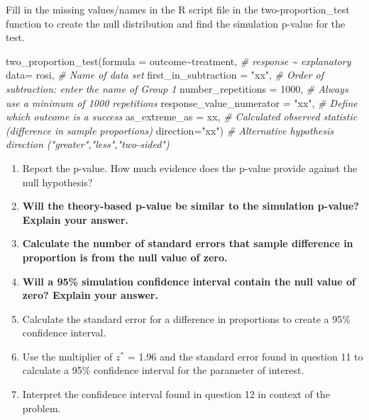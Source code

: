 \documentclass[
]{report}
\newenvironment{Shaded}{\begin{snugshade}}{\end{snugshade}}
\newcommand{\AttributeTok}[1]{\textcolor[rgb]{0.77,0.63,0.00}{#1}}
\newcommand{\CommentTok}[1]{\textcolor[rgb]{0.56,0.35,0.01}{\textit{#1}}}
\newcommand{\DecValTok}[1]{\textcolor[rgb]{0.00,0.00,0.81}{#1}}
\newcommand{\FunctionTok}[1]{\textcolor[rgb]{0.00,0.00,0.00}{#1}}
\newcommand{\NormalTok}[1]{#1}
\newcommand{\SpecialCharTok}[1]{\textcolor[rgb]{0.00,0.00,0.00}{#1}}
\newcommand{\StringTok}[1]{\textcolor[rgb]{0.31,0.60,0.02}{#1}}
\begin{document}
Fill in the missing values/names in the R script file in the two-proportion\_test function to create the null distribution and find the simulation p-value for the test.

\begin{Shaded}
\begin{Highlighting}[]
\FunctionTok{two\_proportion\_test}\NormalTok{(}\AttributeTok{formula =}\NormalTok{ outcome}\SpecialCharTok{\textasciitilde{}}\NormalTok{treatment, }\CommentTok{\# response \textasciitilde{} explanatory}
         \AttributeTok{data=}\NormalTok{ rosi, }\CommentTok{\# Name of data set}
         \AttributeTok{first\_in\_subtraction =} \StringTok{"xx"}\NormalTok{, }\CommentTok{\# Order of subtraction: enter the name of Group 1}
         \AttributeTok{number\_repetitions =} \DecValTok{1000}\NormalTok{, }\CommentTok{\# Always use a minimum of 1000 repetitions}
         \AttributeTok{response\_value\_numerator =} \StringTok{"xx"}\NormalTok{, }\CommentTok{\# Define which outcome is a success }
         \AttributeTok{as\_extreme\_as =}\NormalTok{ xx, }\CommentTok{\# Calculated observed statistic (difference in sample proportions)}
         \AttributeTok{direction=}\StringTok{"xx"}\NormalTok{) }\CommentTok{\# Alternative hypothesis direction ("greater","less","two{-}sided")}
\end{Highlighting}
\end{Shaded}

\begin{enumerate}
\def\labelenumi{\arabic{enumi}.}
\setcounter{enumi}{6}
\item
  Report the p-value. How much evidence does the p-value provide against the null hypothesis?
  \vspace{0.3in}
\item
  \textbf{Will the theory-based p-value be similar to the simulation p-value? Explain your answer.}
  \vspace{0.8in}
\item
  \textbf{Calculate the number of standard errors that sample difference in proportion is from the null value of zero.}
  \vspace{0.8in}
\item
  \textbf{Will a 95\% simulation confidence interval contain the null value of zero? Explain your answer.}
  \vspace{0.8in}
\item
  Calculate the standard error for a difference in proportions to create a 95\% confidence interval.\\
  \vspace{1in}
\item
  Use the multiplier of \(z^*\) = 1.96 and the standard error found in question 11 to calculate a 95\% confidence interval for the parameter of interest.
  \vspace{1in}
\item
  Interpret the confidence interval found in question 12 in context of the problem.
\end{enumerate}
\end{document}
